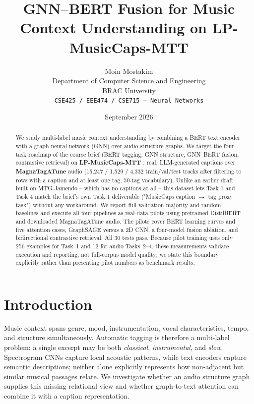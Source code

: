 \documentclass{article}
\title{GNN--BERT Fusion for Music Context Understanding on LP-MusicCaps-MTT}
\date{September 2026}
\author{%
  Moin Mostakim \\
  Department of Computer Science and Engineering \\
  BRAC University \\
  \texttt{CSE425 / EEE474 / CSE715 -- Neural Networks} \\
}
\begin{document}
\maketitle

\begin{abstract}
We study multi-label music context understanding by combining a BERT text
encoder with a graph neural network (GNN) over audio structure graphs. We
target the four-task roadmap of the course brief (BERT tagging, GNN
structure, GNN--BERT fusion, contrastive retrieval) on
\textbf{LP-MusicCaps-MTT} \citep{doh2023lpmusiccaps}: real, LLM-generated
captions over \textbf{MagnaTagATune} audio \citep{law2009magnatagatune}
(15{,}247 / 1{,}529 / 4{,}332 train/val/test tracks after filtering to
rows with a caption and at least one tag, 50-tag vocabulary). Unlike an
earlier draft built on MTG-Jamendo -- which has no captions at all -- this
dataset lets Task 1 and Task 4 match the brief's own Task 1 deliverable
("MusicCaps caption $\to$ tag proxy task") without any workaround. We
report full-validation majority and random baselines and execute all four
pipelines as real-data pilots using pretrained DistilBERT and downloaded
MagnaTagATune audio. The pilots cover BERT learning curves and five
attention cases, GraphSAGE versus a 2D CNN, a four-model fusion ablation,
and bidirectional contrastive retrieval. All 30 tests pass. Because pilot
training uses only 256 examples for Task~1 and 12 for audio Tasks~2--4,
these measurements validate execution and reporting, not full-corpus model
quality; we state this boundary explicitly rather than presenting pilot
numbers as benchmark results.
\end{abstract}

\section{Introduction}
\label{sec:intro}

Music context spans genre, mood, instrumentation, vocal characteristics,
tempo, and structure simultaneously. Automatic tagging is therefore a
multi-label problem: a single excerpt may be both \emph{classical},
\emph{instrumental}, and \emph{slow}. Spectrogram CNNs capture local acoustic
patterns, while text encoders capture semantic descriptions; neither alone
explicitly represents how non-adjacent but similar musical passages relate.
We investigate whether an audio structure graph supplies this missing
relational view and whether graph-to-text attention can combine it with a
caption representation.
\end{document}

